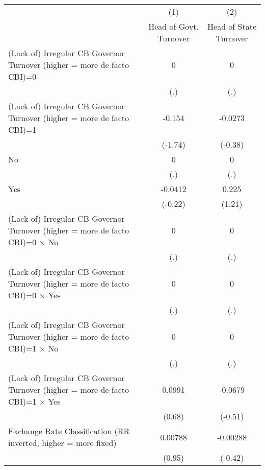 {
\def\sym#1{\ifmmode^{#1}\else\(^{#1}\)\fi}
\begin{tabular*}{\linewidth}{@{\hskip\tabcolsep\extracolsep\fill}l*{2}{c}}
\hline\hline
                &\multicolumn{1}{c}{(1)}&\multicolumn{1}{c}{(2)}\\
                &\multicolumn{1}{c}{Head of Govt. Turnover}&\multicolumn{1}{c}{Head of State Turnover}\\
\hline
(Lack of) Irregular CB Governor Turnover (higher = more de facto CBI)=0&        0         &        0         \\
                &      (.)         &      (.)         \\
[1em]
(Lack of) Irregular CB Governor Turnover (higher = more de facto CBI)=1&   -0.154         &  -0.0273         \\
                &  (-1.74)         &  (-0.38)         \\
[1em]
No              &        0         &        0         \\
                &      (.)         &      (.)         \\
[1em]
Yes             &  -0.0412         &    0.225         \\
                &  (-0.22)         &   (1.21)         \\
[1em]
(Lack of) Irregular CB Governor Turnover (higher = more de facto CBI)=0 $\times$ No&        0         &        0         \\
                &      (.)         &      (.)         \\
[1em]
(Lack of) Irregular CB Governor Turnover (higher = more de facto CBI)=0 $\times$ Yes&        0         &        0         \\
                &      (.)         &      (.)         \\
[1em]
(Lack of) Irregular CB Governor Turnover (higher = more de facto CBI)=1 $\times$ No&        0         &        0         \\
                &      (.)         &      (.)         \\
[1em]
(Lack of) Irregular CB Governor Turnover (higher = more de facto CBI)=1 $\times$ Yes&   0.0991         &  -0.0679         \\
                &   (0.68)         &  (-0.51)         \\
[1em]
Exchange Rate Classification (RR inverted, higher = more fixed)&  0.00788         & -0.00288         \\
                &   (0.95)         &  (-0.42)         \\

\end{tabular*}}

